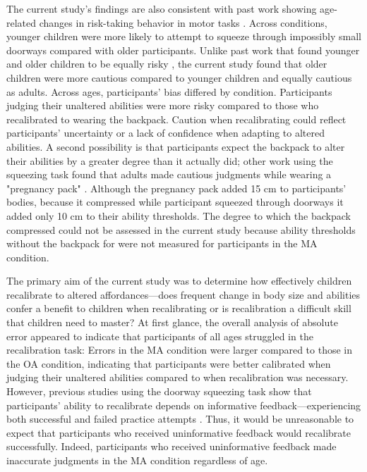 \documentclass[a4paper,man,natbib,floatsintext,noextraspace]{apa6}
\begin{document}
The current study's findings are also consistent with past work showing age-related changes in risk-taking behavior in motor tasks \citep{Plumert95,DekkerNardini,Plumert97}. Across conditions, younger children were more likely to attempt to squeeze through impossibly small doorways compared with older participants. Unlike past work that found younger and older children to be equally risky \citep{DekkerNardini}, the current study found that older children were more cautious compared to younger children and equally cautious as adults. Across ages, participants' bias differed by condition. Participants judging their unaltered abilities were more risky compared to those who recalibrated to wearing the backpack. Caution when recalibrating could reflect participants' uncertainty or a lack of confidence when adapting to altered abilities. A second possibility is that participants expect the backpack to alter their abilities by a greater degree than it actually did; other work using the squeezing task found that adults made cautious judgments while wearing a "pregnancy pack" \citep{PregAps}. Although the pregnancy pack added 15 cm to participants' bodies, because it compressed while participant squeezed through doorways it added only 10 cm to their ability thresholds. The degree to which the backpack compressed could not be assessed in the current study because ability thresholds without the backpack for were not measured for participants in the MA condition.

The primary aim of the current study was to determine how effectively children recalibrate to altered affordances---does frequent change in body size and abilities confer a benefit to children when recalibrating or is recalibration a difficult skill that children need to master? At first glance, the overall analysis of absolute error appeared to indicate that participants of all ages struggled in the recalibration task: Errors in the MA condition were larger compared to those in the OA condition, indicating that participants were better calibrated when judging their unaltered abilities compared to when recalibration was necessary. However, previous studies using the doorway squeezing task show that participants' ability to recalibrate depends on informative feedback---experiencing both successful and failed practice attempts \citep{DoorwayExplore, Recal}. Thus, it would be unreasonable to expect that participants who received uninformative feedback would recalibrate successfully. Indeed, participants who received uninformative feedback made inaccurate judgments in the MA condition regardless of age. 
\end{document}
